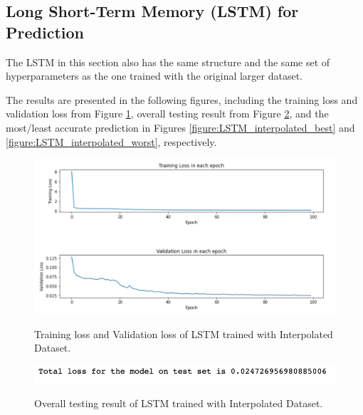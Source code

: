 \subsection{Long Short-Term Memory (LSTM) for Prediction}

The LSTM in this section also has the same structure and the same set of hyperparameters as the one trained with the original larger dataset.

The results are presented in the following figures, including the training loss and validation loss from Figure \ref{figure:LSTM_interpolated_losses}, overall testing result from Figure \ref{figure:LSTM_interpolated_testing}, and the most/least accurate prediction in Figures \ref{figure:LSTM_interpolated_best} and \ref{figure:LSTM_interpolated_worst}, respectively.


\begin{figure}[H]
    \caption{Training loss and Validation loss of LSTM trained with Interpolated Dataset.}
    \includegraphics[scale=0.6]{figures/mantle_convection_images/larger_dataset_interpolated/LSTM_trainingData.png}
    \label{figure:LSTM_interpolated_losses}
\end{figure}

\begin{figure}[H]
    \caption{Overall testing result of LSTM trained with Interpolated Dataset.}
    \includegraphics[scale=0.8]{figures/mantle_convection_images/larger_dataset_interpolated/LSTM_OverallTesting.png}
    \label{figure:LSTM_interpolated_testing}
\end{figure}

